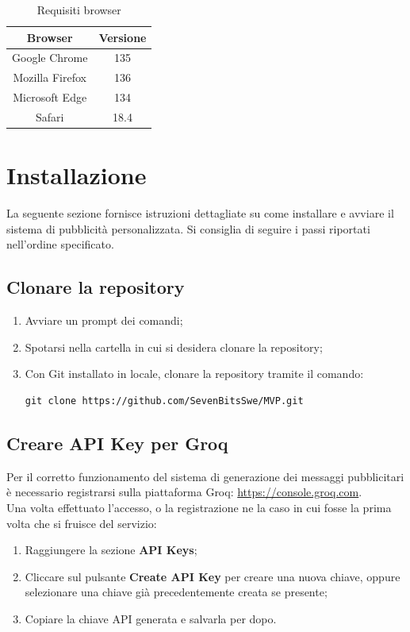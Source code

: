 \documentclass[10pt]{article}
\begin{document}
\begin{justify}
\begin{table}[H]
    \centering
    \begin{tabular}{|c|c|}
        \hline
        \rowcolor{gray!25}
        Browser & Versione \\
        \hline
        Google Chrome & 135\\
        \hline
        Mozilla Firefox & 136\\
        \hline
        Microsoft Edge & 134\\
        \hline
        Safari & 18.4\\
        \hline
    \end{tabular}
    \caption{Requisiti browser}
    \label{tab:requisiti_browser}
\end{table}


\newpage


\section{Installazione}
\label{sec:installazione}
La seguente sezione fornisce istruzioni dettagliate su come installare e avviare il sistema di pubblicità personalizzata. Si consiglia di seguire i passi riportati nell'ordine specificato.

\subsection{Clonare la repository}
\begin{enumerate}
    \item Avviare un prompt dei comandi;
    \item Spotarsi nella cartella in cui si desidera clonare la repository;
    \item Con Git installato in locale, clonare la repository tramite il comando:
\begin{verbatim}
git clone https://github.com/SevenBitsSwe/MVP.git
\end{verbatim}
\end{enumerate}

\subsection{Creare API Key per Groq}
Per il corretto funzionamento del sistema di generazione dei messaggi pubblicitari è necessario registrarsi sulla piattaforma Groq: \url{https://console.groq.com}.\\
Una volta effettuato l'accesso, o la registrazione ne la caso in cui fosse la prima volta che si fruisce del servizio:
\begin{enumerate}
    \item Raggiungere la sezione \textbf{API Keys};
    \item Cliccare sul pulsante \textbf{Create API Key} per creare una nuova chiave, oppure selezionare una chiave già precedentemente creata se presente;
    \item Copiare la chiave API generata e salvarla per dopo.
\end{enumerate}


\end{justify}
\end{document}
